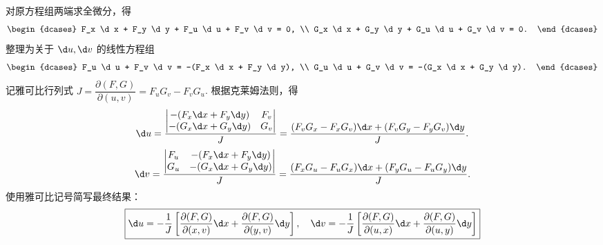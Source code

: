 \begin{solution}
    对原方程组两端求全微分，得
    \begin{equation}
        \begin{dcases}
            F_x \d x + F_y \d y + F_u \d u + F_v \d v = 0, \\
            G_x \d x + G_y \d y + G_u \d u + G_v \d v = 0.
        \end{dcases}
    \end{equation}
    整理为关于 $\d u, \d v$ 的线性方程组
    \begin{equation}
        \begin{dcases}
            F_u \d u + F_v \d v = -(F_x \d x + F_y \d y), \\
            G_u \d u + G_v \d v = -(G_x \d x + G_y \d y).
        \end{dcases}
    \end{equation}
    记雅可比行列式 $J = \dfrac{\partial(F,G)}{\partial(u,v)} = F_u G_v - F_v G_u$. 根据克莱姆法则，得
    \begin{equation}
        \d u = \frac{\begin{vmatrix} -(F_x \d x + F_y \d y) & F_v \\ -(G_x \d x + G_y \d y) & G_v \end{vmatrix}}{J} = \frac{(F_v G_x - F_x G_v) \d x + (F_v G_y - F_y G_v) \d y}{J}.
    \end{equation}
    \begin{equation}
        \d v = \frac{\begin{vmatrix} F_u & -(F_x \d x + F_y \d y) \\ G_u & -(G_x \d x + G_y \d y) \end{vmatrix}}{J} = \frac{(F_x G_u - F_u G_x) \d x + (F_y G_u - F_u G_y) \d y}{J}.
    \end{equation}
    使用雅可比记号简写最终结果：
    \begin{equation}
        \boxed{\d u = -\frac{1}{J} \left[ \frac{\partial(F,G)}{\partial(x,v)} \d x + \frac{\partial(F,G)}{\partial(y,v)} \d y \right], \quad \d v = -\frac{1}{J} \left[ \frac{\partial(F,G)}{\partial(u,x)} \d x + \frac{\partial(F,G)}{\partial(u,y)} \d y \right]}
    \end{equation}
\end{solution}

\endinput
